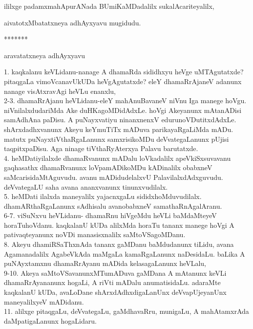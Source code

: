 \documentclass{article}
\begin{document}
\begin{center}
ililxge padamxmahApurANada BUmiKaMDadalilx sukalAcariteyalilx,
\end{center}

\begin{center}
aivatotxMbatatxneya adhAyxyavu mugidudu.
\end{center}

\begin{center}
*******
\end{center}

\begin{center}
aravatatxneya adhAyxyavu
\end{center}

1. kaqkalanu keVLidanu-nanage A dhamaRda sididhxyu heVge uMTAgutatxde?pitaqgaLa vimoVcanavUkUDa heVgAgutatxde? eleY dhamaRrAjaneV adanunx nanage visAtxravAgi heVLu enanxlu,\\
2-3. dhamaRrAjanu heVLidanu-eleY mahAnuBavaneV niVnu Iga manege hoVgu. niVnilalxdudariMda Ake duHKagoMDidAdxLe. hoVgi Akeyanunx mAtanADisi samAdhAna paDisu. A puNayxvatiyu ninanxnenxV edurunoVDutitxdAdxLe. shArxdadhxvanunx Akeyu keYmuTiTx mADuva parikayaRgaLiMda mADu. matutx puNayxtiVthaRgaLanunx samxrisikoMDu deVvategaLanunx pUjisi taqpitxpaDisu. Aga ninage tiVthaRyAterxya Palavu barutatxde.\\
4. heMDatiyilalxde dhamaRvanunx mADalu loVkadalilx apeVkiSxsuvavanu gaqhasathx dhamaRvanunx loVpamADikoMDu kADinalilx obabxneV saMcarisidaMtAguvudu.  avanu mADidudelalxvU PalavilalxdAdxguvudu. deVvategaLU saha avana ananxvanunx tinunxvudilalx.\\
5. heMDati ilalxda maneyalilx yajacnxgaLu sididxhoMduvudilalx. dhamARthaRgaLanunx sAdhisalu avanobabxneV samathaRnAgalAranu.\\
6-7. viSuNxvu heVLidanu- dhamaRnu hiVgeMdu heVLi baMdaMteyeV horaTuhoVdanu. kaqkalanU kUDa alilxMda horaTu tananx manege hoVgi A pativaqteyanunx noVDi manasisxnalilx saMtoVSagoMDanu.\\
8. Akeyu dhamiRSaThxnAda tananx gaMDanu baMdudanunx tiLidu, avana Agamanadalilx AgabeVkAda maMgaLa kamaRgaLanunx naDesidaLu. baLika A puNAyxtamxnu dhamaRrAyanu mADida kelasagaLanunx heVLalu,\\
9-10. Akeya saMtoVSavanunxMTumADuva gaMDana A mAtanunx keVLi dhamaRrAyananunx hogaLi, A riVti mADalu anumatisidaLu. adaraMte kaqkalanU kUDa, avaLoDane shArxdAdhxdigaLanUnx deVvapUjeyanUnx maneyalilxyeV mADidanu.\\
11. alilxge pitaqgaLu, deVvategaLu, gaMdhavaRru, munigaLu, A mahAtamxrAda daMpatigaLanunx hogaLidaru.\\
\end{document}
